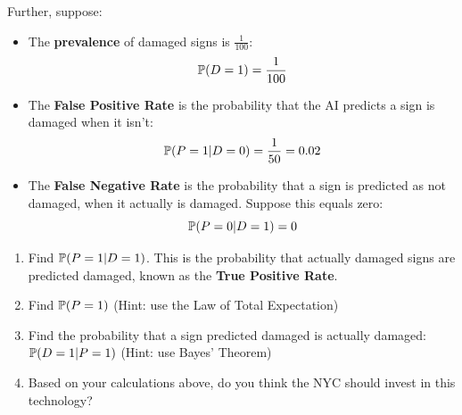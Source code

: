 \documentclass[11 pt]{article}
\begin{document}
\begin{enumerate}
Further, suppose:
\begin{itemize}
    \item The \textbf{prevalence} of damaged signs is $\frac{1}{100}$:
    \begin{equation*}
        \mathbb{P} (D = 1) = \frac{1}{100}
    \end{equation*}
    \item The \textbf{False Positive Rate} is the probability that the AI predicts a sign is damaged when it isn't:
    \begin{equation*}
        \mathbb{P} (P = 1 \vert D = 0) = \frac{1}{50} = 0.02
    \end{equation*}
    \item The \textbf{False Negative Rate} is the probability that a sign is predicted as not damaged, when it actually is damaged. Suppose this equals zero:
    \begin{equation*}
         \mathbb{P} (P = 0 \vert D = 1) = 0
     \end{equation*}
\end{itemize}

\begin{enumerate}
\item Find $\mathbb{P} (P = 1 \vert D = 1)$. This is the probability that actually damaged signs are predicted damaged, known as the \textbf{True Positive Rate}.
\item Find $\mathbb{P} (P = 1)$ (Hint: use the Law of Total Expectation)
\item Find the probability that a sign predicted damaged is actually damaged: $\mathbb{P} (D = 1 \vert P = 1)$ (Hint: use Bayes' Theorem)
\item Based on your calculations above, do you think the NYC should invest in this technology?
\end{enumerate}
\end{enumerate}
\end{document}
